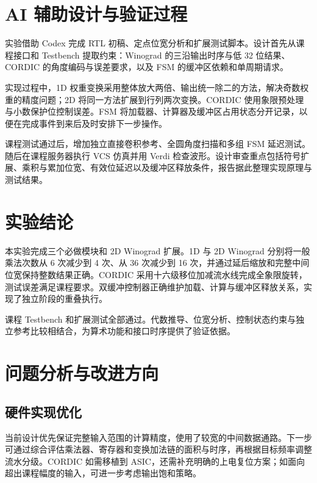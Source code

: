 \documentclass[
  10pt,
  a4paper,
]{article}
\begin{document}
\section{AI
辅助设计与验证过程}\label{ai-ux8f85ux52a9ux8bbeux8ba1ux4e0eux9a8cux8bc1ux8fc7ux7a0b}

实验借助 Codex 完成 RTL
初稿、定点位宽分析和扩展测试脚本。设计首先从课程接口和 Testbench
提取约束：Winograd 的三沿输出时序与低 32 位结果、CORDIC
的角度编码与误差要求，以及 FSM 的缓冲区依赖和单周期请求。

实现过程中，1D
权重变换采用整体放大两倍、输出统一除二的方法，解决奇数权重的精度问题；2D
将同一方法扩展到行列两次变换。CORDIC
使用象限预处理与小数保护位控制误差。FSM
将加载器、计算器及缓冲区占用状态分开记录，以便在完成事件到来后及时安排下一步操作。

课程测试通过后，增加独立直接卷积参考、全圆角度扫描和多组 FSM
延迟测试。随后在课程服务器执行 VCS 仿真并用 Verdi
检查波形。设计审查重点包括符号扩展、乘积与累加位宽、有效位延迟以及缓冲区释放条件，报告据此整理实现原理与测试结果。

\section{实验结论}\label{ux5b9eux9a8cux7ed3ux8bba}

本实验完成三个必做模块和 2D Winograd 扩展。1D 与 2D Winograd
分别将一般乘法次数从 6 次减少到 4 次、从 36 次减少到 16
次，并通过延后缩放和完整中间位宽保持整数结果正确。CORDIC
采用十六级移位加减流水线完成全象限旋转，测试误差满足课程要求。双缓冲控制器正确维护加载、计算与缓冲区释放关系，实现了独立阶段的重叠执行。

课程 Testbench
和扩展测试全部通过。代数推导、位宽分析、控制状态约束与独立参考比较相结合，为算术功能和接口时序提供了验证依据。

\section{问题分析与改进方向}\label{ux95eeux9898ux5206ux6790ux4e0eux6539ux8fdbux65b9ux5411}

\subsection{硬件实现优化}\label{ux786cux4ef6ux5b9eux73b0ux4f18ux5316}

当前设计优先保证完整输入范围的计算精度，使用了较宽的中间数据通路。下一步可通过综合评估乘法器、寄存器和变换加法链的面积与时序，再根据目标频率调整流水分级。CORDIC
如需移植到
ASIC，还需补充明确的上电复位方案；如面向超出课程幅度的输入，可进一步考虑输出饱和策略。
\end{document}
